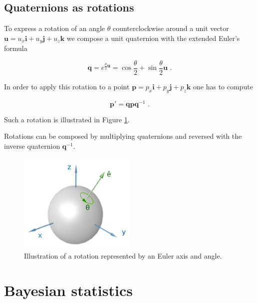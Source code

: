 \subsection{Quaternions as rotations}

To express a rotation of an angle $\theta$ counterclockwise around a unit vector $\bm{u} = u_x \bm{i} + u_y \bm{j} + u_z \bm{k}$ we compose a unit quaternion with the extended Euler's formula

\begin{equation}
\label{eq:euler_ext}
    \bm{q} = e^{{\frac{\theta}{2}}{\bm{u}}} = \cos{\frac{\theta}{2}} + \sin{\frac{\theta}{2} \bm{u}} \textrm{ .}
\end{equation}

In order to apply this rotation to a point $\bm{p} = p_x \bm{i} + p_y \bm{j} + p_z \bm{k}$ one has to compute

\begin{equation}
\label{eq:quaternion_rotation}
    \bm{p}' = \bm{q} \bm{p} \bm{q}^{-1} \textrm{ .}
\end{equation}

Such a rotation is illustrated in Figure \ref{fig:quaternion_rot}.

Rotations can be composed by multiplying quaternions and reversed with the inverse quaternion $\bm{q}^{-1}$.

\begin{figure}[hbt!]
    \centering
    \includegraphics[width=0.5\textwidth]{figures/quaternion_rot.png}
    \caption{Illustration of a rotation represented by an Euler axis and angle.}
    \label{fig:quaternion_rot}
\end{figure}

\section{Bayesian statistics}
\label{sec:bayes}

